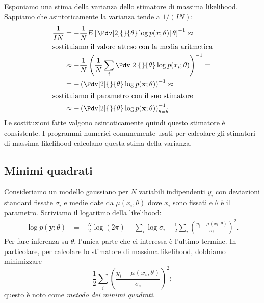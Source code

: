 Esponiamo una stima della varianza dello stimatore di massima likelihood.
Sappiamo che asintoticamente la varianza tende a $1/(IN)$:
\begin{align*}
	\frac1{IN}
	&= -\frac1N E \left[ \left.\Pdv[2]{}{\theta} \log p(x;\theta) \right|\theta \right]^{-1} \approx \\
	\intertext{sostituiamo il valore atteso con la media aritmetica}
	&\approx -\frac1N \left( \frac1N \sum_i \Pdv[2]{}{\theta} \log p(x_i;\theta) \right)^{-1} = \\
	&= - \left( \Pdv[2]{}{\theta} \log p(\mathbf x;\theta) \right)^{-1} \approx \\
	\intertext{sostituiamo il parametro con il suo stimatore}
	&\approx - \left( \Pdv[2]{}{\theta} \log p(\mathbf x;\theta) \right)^{-1}_{\theta=\hat\theta}.
\end{align*}
Le sostituzioni fatte valgono asintoticamente quindi questo stimatore è consistente.
I programmi numerici comunemente usati per calcolare gli stimatori di massima likelihood calcolano questa stima della varianza.

\subsection{Minimi quadrati}

Consideriamo un modello gaussiano per $N$ variabili indipendenti $y_i$
con deviazioni standard fissate $\sigma_i$
e medie date da $\mu(x_i,\theta)$ dove $x_i$ sono fissati e $\theta$ è il parametro.
Scriviamo il logaritmo della likelihood:
\begin{align*}
	\log p(\mathbf y;\theta)
	&= -\frac N2\log(2\pi)
	- \sum_i\log\sigma_i
	- \frac12 \sum_i \left( \frac{y_i - \mu(x_i,\theta)}{\sigma_i} \right)^2.
\end{align*}
Per fare inferenza su $\theta$, l'unica parte che ci interessa è l'ultimo termine.
In particolare, per calcolare lo stimatore di massima likelihood, dobbiamo minimizzare
\begin{equation*}
	\frac12 \sum_i \left( \frac{y_i - \mu(x_i,\theta)}{\sigma_i} \right)^2;
\end{equation*}
questo è noto come \emph{metodo dei minimi quadrati}.

